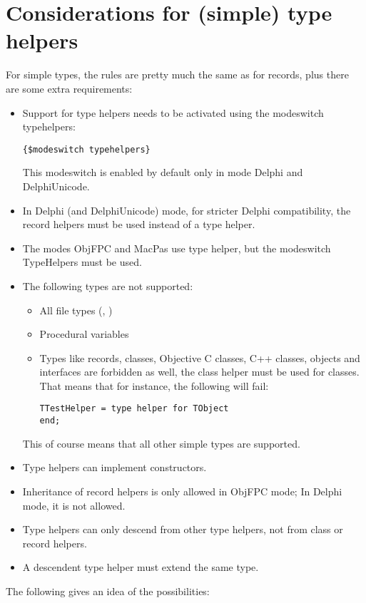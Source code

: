 \section{Considerations for (simple) type helpers}
For simple types, the rules are pretty much the same as for records, plus there are some extra requirements:
\begin{itemize}
\item Support for type helpers needs to be activated using the modeswitch typehelpers:
\begin{verbatim}
{$modeswitch typehelpers}
\end{verbatim}
This modeswitch is enabled by default only in mode Delphi and DelphiUnicode.
\item In Delphi (and DelphiUnicode) mode, for stricter Delphi compatibility, the record helpers must be used instead
of a type helper.
\item The modes ObjFPC and MacPas use type helper, but the modeswitch TypeHelpers must be used.
\item The following types are not supported:
\begin{itemize}
\item All file types (, )
\item Procedural variables
\item Types like records, classes, Objective C classes, C++ classes, objects and interfaces are forbidden as well,
the class helper must be used for classes. That means that for instance, the following will fail:
\begin{verbatim}
TTestHelper = type helper for TObject
end;
\end{verbatim}
\end{itemize}
This of course means that all other simple types are supported.
\item Type helpers can implement constructors.
\item Inheritance of record helpers is only allowed in ObjFPC mode; In Delphi mode, it is not allowed.
\item Type helpers can only descend from other type helpers, not from class or record helpers.
\item A descendent type helper must extend the same type.
\end{itemize}
The following gives an idea of the possibilities:
